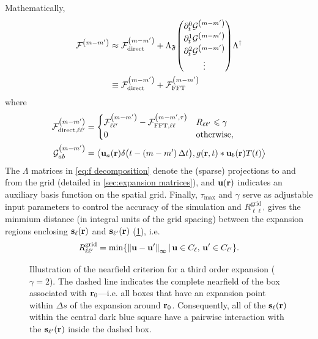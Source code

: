 Mathematically,
\begin{equation}
  \begin{aligned}
    \mathcal{F}^\qty(m - m') & \approx \mathcal{F}^\qty(m-m')_\text{direct} + \Lambda_\mathfrak{F} \mqty(\partial_t^0 \mathcal{G}^\qty(m-m') \\ \partial_t^1 \mathcal{G}^\qty(m-m') \\ \partial_t^2 \mathcal{G}^\qty(m-m') \\ \vdots) \Lambda^\dagger \\
                             & \equiv \mathcal{F}^\qty(m-m')_\text{direct} + \mathcal{F}^\qty(m-m')_\text{FFT}
    \end{aligned}
  \label{eq:f decomposition}
\end{equation}
where
\begin{subequations}
  \begin{align}
    \mathcal{F}^\qty(m-m')_{\text{direct},\ell\ell'} &= \begin{cases}
      \mathcal{F}^\qty(m-m')_{\ell\ell'}  - \mathcal{F}^\qty(m-m',\tau)_{\text{FFT},\ell\ell} & R_{\ell\ell'} \leqslant \gamma \\
      0 & \text{otherwise},
    \end{cases} \\
    \mathcal{G}^\qty(m-m')_{ab} &= \left< \vb{u}_a(\vb{r})\delta\qty\big(t - (m-m')\, \Delta t), g(\vb{r}, t) \ast \vb{u}_{b}(\vb{r})T(t) \right>
  \end{align}
  \label{eq:decomposition elements}
\end{subequations}
The $\Lambda$ matrices in \cref{eq:f decomposition} denote the (sparse) projections to and from the grid (detailed in \cref{sec:expansion matrices}), and $\vb{u}(\vb{r})$ indicates an auxiliary basis function on the spatial grid.
Finally, $\tau_\text{max}$ and $\gamma$ serve as adjustable input parameters to control the accuracy of the simulation and $R^\text{grid}_{\ell\ell'}$ gives the minmium distance (in integral units of the grid spacing) between the expansion regions enclosing $\vb{s}_\ell(\vb{r})$ and $\vb{s}_{\ell'}(\vb{r})$ (\cref{fig:nearfield criterion}), i.e.
\begin{equation}
  R^\text{grid}_{\ell\ell'} = \min\!\qty{\norm{\vb{u} - \vb{u}'}_\infty \, | \, \vb{u} \in C_\ell, \, \vb{u}' \in C_{\ell'}}.
\end{equation}

\begin{figure}
  \centering
  \caption{\label{fig:nearfield criterion}Illustration of the nearfield criterion for a third order expansion ($\gamma = 2$).
    The dashed line indicates the complete nearfield of the box associated with \textcolor{cbblue}{$\vb{r}_0$}---i.e. all boxes that have an expansion point within $\Delta s$ of the expansion around \textcolor{cbblue}{$\vb{r}_0$}.
    Consequently, all of the $\vb{s}_\ell(\vb{r})$ within the central dark blue square have a pairwise interaction with the $\vb{s}_{\ell'}(\vb{r})$ inside the dashed box.
  }
\end{figure}

